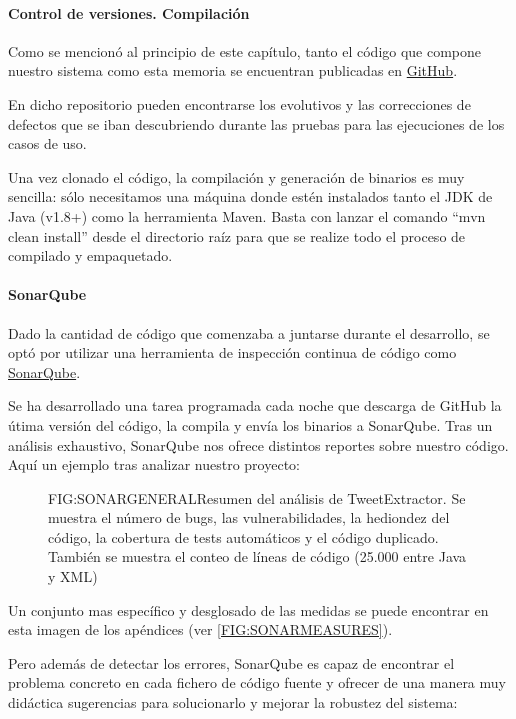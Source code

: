 \paragraph{Control de versiones. Compilación}
Como se mencionó al principio de este capítulo, tanto el código que compone nuestro sistema como esta memoria se encuentran publicadas en \href{https://github.com/plyskor/TweetExtractor}{GitHub}. 

En dicho repositorio pueden encontrarse los evolutivos y las correcciones de defectos que se iban descubriendo durante las pruebas para las ejecuciones de los casos de uso.
 
 Una vez clonado el código, la compilación y generación de binarios es muy sencilla: sólo necesitamos una máquina donde estén instalados tanto el JDK de Java (v1.8+) como la herramienta Maven. Basta con lanzar el comando ``mvn clean install'' desde el directorio raíz para que se realize todo el proceso de compilado y empaquetado.
 
\paragraph{SonarQube}
Dado la cantidad de código que comenzaba a juntarse durante el desarrollo, se optó por utilizar una herramienta de inspección continua de código como \href{https://www.sonarqube.org/}{SonarQube}. 

Se ha desarrollado una tarea programada cada noche que descarga de GitHub la útima versión del código, la compila y envía los binarios a SonarQube. Tras un análisis exhaustivo, SonarQube nos ofrece distintos reportes sobre nuestro código. Aquí un ejemplo tras analizar nuestro proyecto:

\begin{figure}[Reporte general SonarQube]{FIG:SONARGENERAL}{Resumen del análisis de TweetExtractor. Se muestra el número de bugs, las vulnerabilidades, la hediondez del código, la cobertura de tests automáticos y el código duplicado. También se muestra el conteo de líneas de código (25.000 entre Java y XML)}
\end{figure}

Un conjunto mas específico y desglosado de las medidas se puede encontrar en esta imagen de los apéndices (ver \ref{FIG:SONARMEASURES}). 

Pero además de detectar los errores, SonarQube es capaz de encontrar el problema concreto en cada fichero de código fuente y ofrecer de una manera muy didáctica sugerencias para solucionarlo y mejorar la robustez del sistema:

